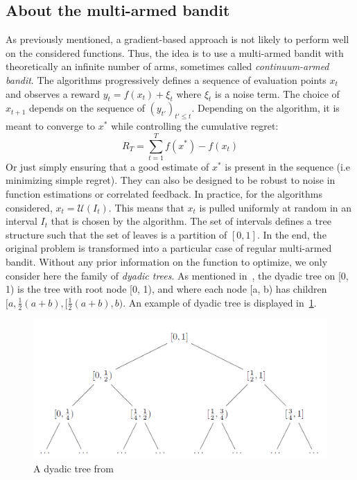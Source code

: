 \documentclass[a4paper,10pt]{article}
\begin{document}
\subsection{About the multi-armed bandit}
\label{mab}
As previously mentioned, a gradient-based approach is not likely to perform well on the considered functions. Thus, the idea is to use a multi-armed bandit with theoretically an infinite number of arms, sometimes called \textit{continuum-armed bandit}. The algorithms progressively defines a sequence of evaluation points $x_t$ and observes a reward $y_t=f(x_t)+\xi_t$ where $\xi_t$ is a noise term. The choice of $x_{t+1}$ depends on the sequence of $(y_{t'})_{t'\le t}$. Depending on the algorithm, it is meant to converge to $x^*$ while controlling the cumulative regret:
\begin{equation}
\label{regret}
R_T = \underset{t=1}{\overset{T}{\sum}}f(x^*)-f(x_t)
\end{equation}
Or just simply ensuring that a good estimate of $x^*$ is present in the sequence (i.e minimizing simple regret). They can also be designed to be robust to noise in function estimations or correlated feedback.
In practice, for the algorithms considered, $x_t = \mathcal{U}(I_t)$. This means that $x_t$ is pulled uniformly at random in an interval $I_t$ that is chosen by the algorithm. The set of intervals defines a tree structure such that the set of leaves is a partition of $[0,1]$. In the end, the original problem is transformed into a particular case of regular multi-armed bandit. Without any prior information on the function to optimize, we only consider here the family of \textit{dyadic trees}. As mentioned in~\cite{bull2013adaptive}, the dyadic tree on [0, 1) is the tree with root node [0, 1), and where each node [a, b) has children $[a, \frac{1}{2}(a+b), [ \frac{1}{2}(a+b), b)$. An example of dyadic tree is displayed in~\ref{dydtree}. 

\begin{figure}
\label{dydtree}
\centering
\includegraphics[scale=0.3]{dyadic}
\caption{A dyadic tree from~\cite{bull2013adaptive}}
\end{figure}
\end{document}
